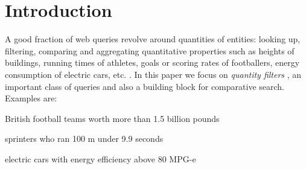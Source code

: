 
\section{Introduction}\label{sec:intro}

\begin{comment}
\subsection{Contribution.}
The salient contributions of this work are as follows:
\begin{itemize}
\item We propose a joint model for entity disambiguation and quantity fact extraction in quantitative relational web tables.
\item We introduce TabQs, a system for answering quantity queries from web tables.
\item  We present extensive experiments on real-world data, showing the high quality of our approach.
\item A demo of our search system can be found at: \\ \textcolor{blue}{\url{http://tabqs-demo.webredirect.org/table/index.html}}
\end{itemize}
\end{comment}



%
%
%
%
A good fraction of web queries revolve around quantities of
entities: looking up, filtering, comparing and aggregating
quantitative properties such as heights of buildings, 
running times of athletes, goals or scoring rates of footballers,
energy consumption of electric cars, etc. 
\cite{DBLP:conf/semweb/HoIPBW19,DBLP:conf/wsdm/BondarenkoBVAFP20,DBLP:journals/corr/abs-2001-03272}.
In this paper we focus on {\em quantity filters}
\cite{DBLP:conf/semweb/HoIPBW19,DBLP:conf/wsdm/HoPKBW20}, 
an important class
of queries and also a building block for comparative search.
Examples are:
\squishlist
\item British football teams worth more than 1.5 billion pounds
\item sprinters who ran 100 m under 9.9 seconds
\item electric cars with energy efficiency above 80 MPG-e
\squishend


